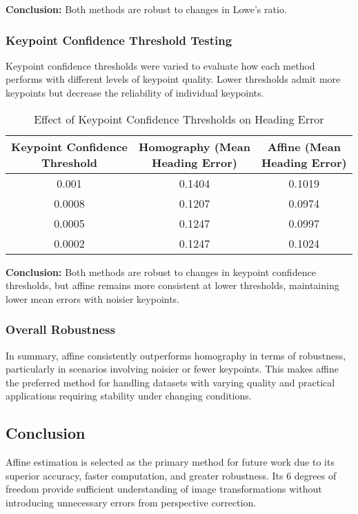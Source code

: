 \textbf{Conclusion:} Both methods are robust to changes in Lowe’s ratio. 

\subsubsection{Keypoint Confidence Threshold Testing}
Keypoint confidence thresholds were varied to evaluate how each method performs with different levels of keypoint quality. Lower thresholds admit more keypoints but decrease the reliability of individual keypoints.

\begin{table}[H]
    \centering
    \begin{tabular}{|c|c|c|}
        \hline
        \makecell{\textbf{Keypoint Confidence} \\ \textbf{Threshold}} & \makecell{\textbf{Homography (Mean} \\ \textbf{Heading Error)}} & \makecell{\textbf{Affine (Mean} \\ \textbf{Heading Error)}}\\
        \hline
        0.001 & 0.1404 & 0.1019 \\  
        0.0008 & 0.1207 & 0.0974 \\  
        0.0005 & 0.1247 & 0.0997 \\  
        0.0002 & 0.1247 & 0.1024 \\  
        \hline
    \end{tabular}
    \caption{Effect of Keypoint Confidence Thresholds on Heading Error}
\end{table}

\textbf{Conclusion:} Both methods are robust to changes in keypoint confidence thresholds, but affine remains more consistent at lower thresholds, maintaining lower mean errors with noisier keypoints.

\subsubsection{Overall Robustness}
In summary, affine consistently outperforms homography in terms of robustness, particularly in scenarios involving noisier or fewer keypoints. This makes affine the preferred method for handling datasets with varying quality and practical applications requiring stability under changing conditions.

\subsection{Conclusion}
Affine estimation is selected as the primary method for future work due to its superior accuracy, faster computation, and greater robustness. Its 6 degrees of freedom provide sufficient understanding of image transformations without introducing unnecessary errors from perspective correction. 



